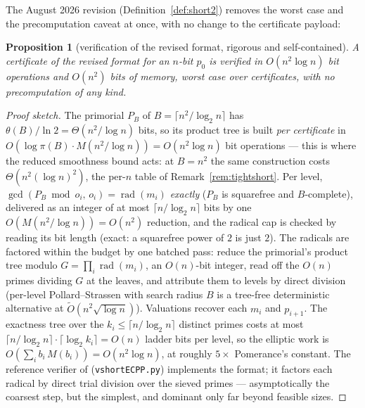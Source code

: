 \documentclass[11pt]{amsart}
\newcommand{\Ot}{\widetilde{O}}
\theoremstyle{plain}
\newtheorem{proposition}[theorem]{Proposition}
\theoremstyle{definition}
\theoremstyle{remark}
\begin{document}
The August 2026 revision (Definition~\ref{def:short2}) removes the worst case and the
precomputation caveat at once, with no change to the certificate payload:

\begin{proposition}[verification of the revised format, rigorous and self-contained]
\label{prop:short2verif}
A certificate of the revised format for an $n$-bit $p_0$ is verified in $O(n^2\log n)$ bit
operations and $O(n^2)$ bits of memory, worst case over certificates, with no precomputation of any
kind.
\end{proposition}

\begin{proof}[Proof sketch]
The primorial $P_B$ of $B = \lceil n^2/\log_2 n\rceil$ has $\theta(B)/\ln 2 = \Theta(n^2/\log n)$
bits, so its product tree is built \emph{per certificate} in
$O(\log\pi(B)\cdot M(n^2/\log n)) = O(n^2\log n)$ bit operations --- this is where the reduced
smoothness bound acts: at $B = n^2$ the same construction costs $\Theta(n^2(\log n)^2)$, the per-$n$
table of Remark~\ref{rem:tightshort}.  Per level, $\gcd(P_B \bmod o_i,\, o_i) =
\operatorname{rad}(m_i)$ \emph{exactly} ($P_B$ is squarefree and $B$-complete), delivered as an
integer of at most $\lceil n/\log_2 n\rceil$ bits by one $O(M(n^2/\log n)) = O(n^2)$ reduction, and
the radical cap is checked by reading its bit length (exact: a squarefree power of $2$ is just
$2$).  The radicals are factored within the budget by
one batched pass: reduce the primorial's product tree modulo $G = \prod_i \operatorname{rad}(m_i)$,
an $O(n)$-bit integer, read off the $O(n)$ primes dividing $G$ at the leaves, and attribute them to
levels by direct division (per-level Pollard--Strassen with search radius $B$ is a tree-free
deterministic alternative at $\Ot(n^2\sqrt{\log n})$).  Valuations recover each $m_i$ and
$p_{i+1}$.  The exactness tree over the $k_i \le \lceil n/\log_2 n\rceil$
distinct primes costs at most $\lceil n/\log_2 n\rceil\cdot\lceil\log_2 k_i\rceil = O(n)$ ladder
bits per level, so
the elliptic work is $O(\sum_i b_i\,M(b_i)) = O(n^2\log n)$, at roughly $5\times$ Pomerance's
constant.  The reference verifier of \cite{Short} (\texttt{vshortECPP.py}) implements the format; it factors each
radical by direct trial division over the sieved primes --- asymptotically the coarsest step, but
the simplest, and dominant only far beyond feasible sizes.
\end{proof}
\end{document}
